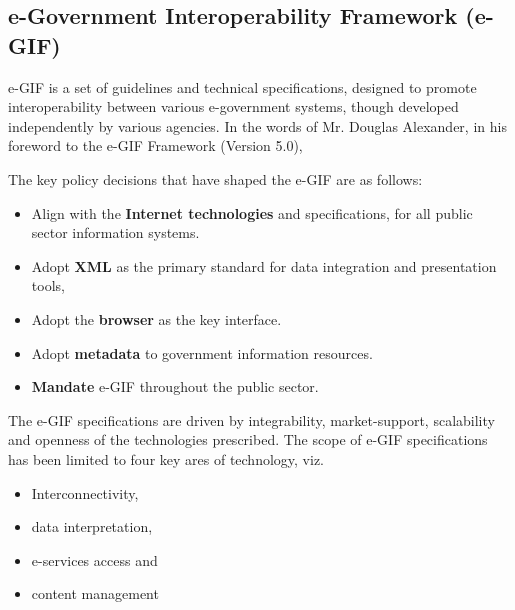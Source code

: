 \subsection*{e-Government Interoperability Framework (e-GIF)}
e-GIF is a set of guidelines and technical specifications, designed to promote interoperability between various e-government systems, though developed independently by various agencies. In the words of Mr. Douglas Alexander, in his foreword to the e-GIF Framework (Version 5.0),

\begin{quotation}
	\noindent {}
\end{quotation}

The key policy decisions that have shaped the e-GIF are as follows:

\begin{itemize}
	\item Align with the \textbf{Internet technologies} and specifications, for all public sector information systems.
	\item Adopt \textbf{XML} as the primary standard for data integration and presentation tools,
	\item Adopt the \textbf{browser} as the key interface.
	\item Adopt \textbf{metadata} to government information resources.
	\item \textbf{Mandate} e-GIF throughout the public sector.
\end{itemize}

The e-GIF specifications are driven by integrability, market-support, scalability and openness of the technologies prescribed. The scope of e-GIF specifications has been limited to four key ares of technology, viz.

\begin{itemize}
	\item Interconnectivity,
	\item data interpretation,
	\item e-services access  and 
	\item content management
\end{itemize}

\newpage\thispagestyle{empty}
